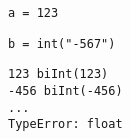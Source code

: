 
\verb|a = 123|

\verb|b = int("-567")|


\begin{verbatim}
123 biInt(123)
-456 biInt(-456)
...
TypeError: float
\end{verbatim}
